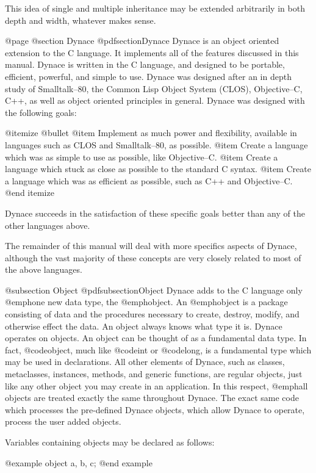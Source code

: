 This idea of single and multiple inheritance may be extended arbitrarily
in both depth and width, whatever makes sense.

@page
@section Dynace
@pdfsection{Dynace}
Dynace is an object oriented extension to the C language.  It implements
all of the features discussed in this manual.  Dynace is written in the
C language, and designed to be portable, efficient, powerful, and
simple to use.  Dynace was designed after an in depth study of Smalltalk--80,
the Common Lisp Object System (CLOS), Objective--C, C++, as well as
object oriented principles in general.  Dynace was designed with the following
goals:

@itemize @bullet
@item  Implement as much power and flexibility, available in languages such
as CLOS and Smalltalk--80, as possible.
@item  Create a language which was as simple to use as possible, like
Objective--C.
@item  Create a language which stuck as close as possible to the standard
C syntax.
@item  Create a language which was as efficient as possible, such as C++
and Objective--C.
@end itemize

Dynace succeeds in the satisfaction of these specific goals better than any
of the other languages above.

The remainder of this manual will deal with more specifics aspects of Dynace,
although the vast majority of these concepts are very closely related to
most of the above languages.

@subsection Object
@pdfsubsection{Object}
Dynace adds to the C language only @emph{one} new data type, the @emph{object}.
An @emph{object} is a package consisting of data and the procedures
necessary to create, destroy, modify, and otherwise effect the data.  An
object always knows what type it is.  Dynace operates on objects.  An
object can be thought of as a fundamental data type.  In fact,
@code{object}, much like @code{int} or @code{long}, is a fundamental
type which may be used in declarations.  All other elements of Dynace, such
as classes, metaclasses, instances, methods, and generic functions, are
regular objects, just like any other object you may create in an
application.  In this respect, @emph{all} objects are treated exactly
the same throughout Dynace.  The exact same code which processes the pre-defined
Dynace objects, which allow Dynace to operate, process the user added objects.

Variables containing objects may be declared as follows:

@example
        object    a, b, c;
@end example


